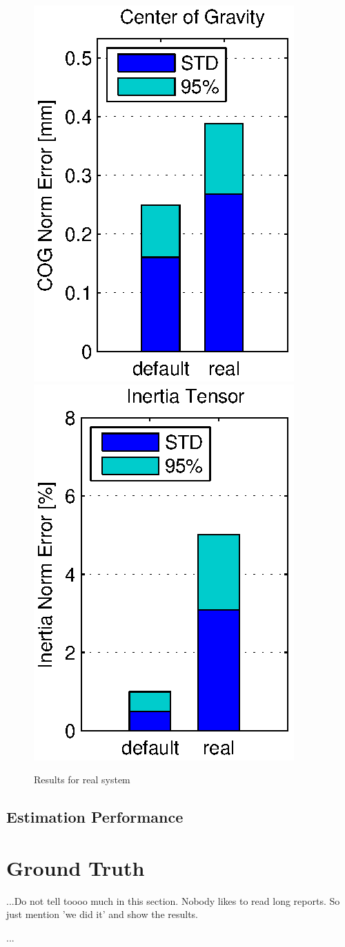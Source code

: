\begin{figure}[hbtp]
\includegraphics[scale=.72]{images/results/err_cmp_real_cog.eps}
\includegraphics[scale=.72]{images/results/err_cmp_real_tensor.eps}
\caption{Results for real system}
\label{fig:err_cmp_real}
\end{figure}

\subsection{Estimation Performance}

\section{Ground Truth}
...Do not tell toooo much in this section. Nobody likes to read long reports. So just mention 'we did it' and show the results.

...